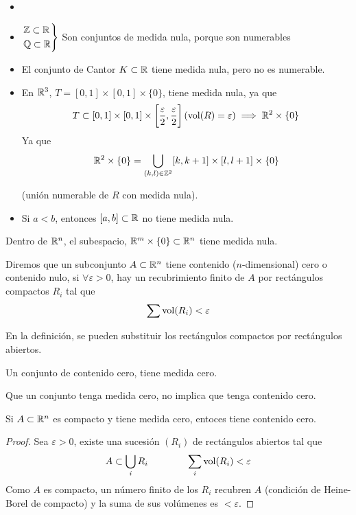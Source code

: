 \begin{example*}
	\begin{itemize}
		\item[]
		\item $\begin{rcases} \mathbb{Z} \subset \mathbb{R} \\ \mathbb{Q} \subset \mathbb{R}\end{rcases}$
			Son conjuntos de medida nula, porque son numerables
		\item El conjunto de Cantor $K \subset \mathbb{R}$ tiene medida nula, pero
			no es numerable.
		\item En $\mathbb{R}^3$, $T = [0,1]\times[0,1]\times\{0\}$, tiene medida
			nula, ya que
			\[
				T \subset [0,1] \times [0,1] \times
				\left[\frac{\varepsilon}{2},\frac{\varepsilon}{2}
				\right] (\operatorname{vol}(R)=\varepsilon) \implies
				\mathbb{R}^2\times\{0\}
			\]
			Ya que
			\[
				\mathbb{R}^2 \times \{0\} = \bigcup_{(k,l) \in \mathbb{Z}^2}
				[k,k+1] \times [l,l+1] \times \{0\}
			\]
	
			(unión numerable de $R$ con medida nula).
		\item Si $a < b$, entonces $[a,b] \subset \mathbb{R}$ no tiene medida nula.
	\end{itemize}
\end{example*}
\begin{col}
	Dentro de $\mathbb{R}^n$, el subespacio, $\mathbb{R}^m \times \{0\} \subset \mathbb{R}^n$
	tiene medida nula.
\end{col}

\begin{defi}
	Diremos que un subconjunto $A \subset \mathbb{R}^n$ tiene contenido
	($n$-dimensional) cero o contenido nulo, si $\forall \varepsilon > 0$, hay un
	recubrimiento finito de $A$ por rectángulos compactos $R_i$ tal que
	\[
		\sum \operatorname{vol}(R_i) < \varepsilon
	\]
\end{defi}
\begin{obs*}
	En la definición, se pueden substituir los rectángulos compactos por
	rectángulos abiertos.
\end{obs*}
\begin{obs*}
	Un conjunto de contenido cero, tiene medida cero.
\end{obs*}
\begin{obs*}
	Que un conjunto tenga medida cero, no implica que tenga contenido cero.
\end{obs*}

\begin{prop}
	Si $A \subset \mathbb{R}^n$ es compacto y tiene medida cero, entoces tiene contenido
	cero.
\end{prop}
\begin{proof}
	Sea $\varepsilon > 0$, existe una sucesión $(R_i)$ de rectángulos abiertos tal
	que
	\[
		A \subset \bigcup_i R_i \qquad \qquad \sum_i \operatorname{vol}(R_i) < \varepsilon
	\]
	Como $A$ es compacto, un número finito de los $R_i$ recubren $A$ (condición
	de Heine-Borel de compacto) y la suma de sus volúmenes es $< \varepsilon$.
\end{proof}

